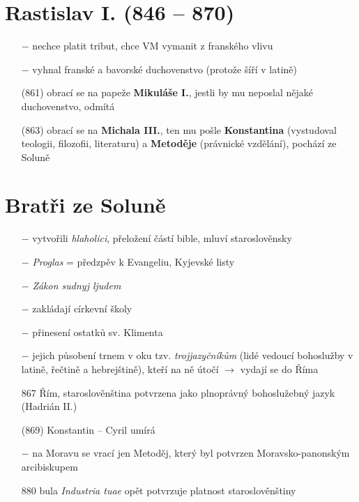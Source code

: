 \documentclass{article}
\begin{document}
\section*{Rastislav I. (846 -- 870)}
\begin{itemize}
    \vspace{-0.5em}
    \setlength\itemsep{0.15em}
    \item[$-$] nechce platit tribut, chce VM vymanit z franského vlivu
    \item[$-$] vyhnal franské a bavorské duchovenstvo (protože šíří v latině)
    \item[(861)] obrací se na papeže \textbf{Mikuláše I.}, jestli by mu neposlal nějaké duchovenstvo, odmítá
    \item[(863)] obrací se na \textbf{Michala III.}, ten mu pošle \textbf{Konstantina} (vystudoval teologii, filozofii, literaturu) a \textbf{Metoděje} (právnické vzdělání), pochází ze Soluně
\end{itemize}

\section*{Bratři ze Soluně}
\begin{itemize}
    \vspace{-0.5em}
    \setlength\itemsep{0.15em}
    \item[$-$] vytvořili \textit{hlaholici}, přeložení částí bible, mluví staroslověnsky
    \item[$-$] \textit{Proglas} = předzpěv k Evangeliu, Kyjevské listy
    \item[$-$] \textit{Zákon sudnyj ljudem}
    \item[$-$] zakládají církevní školy
    \item[$-$] přinesení ostatků sv. Klimenta
    \item[$-$] jejich působení trnem v oku tzv. \textit{trojjazyčníkům} (lidé vedoucí bohoslužby v latině, řečtině a hebrejštině), kteří na ně útočí $\rightarrow$ vydají se do Říma
    \item[867] Řím, staroslověnština potvrzena jako plnoprávný bohoslužebný jazyk (Hadrián II.)
    \item[(869)] Konstantin -- Cyril umírá
    \item[$-$] na Moravu se vrací jen Metoděj, který byl potvrzen Moravsko-panonským arcibiskupem
    \item[880] bula \textit{Industria tuae} opět potvrzuje platnost staroslověnštiny
\end{itemize}
\end{document}

